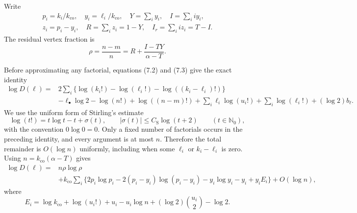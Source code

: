 

Write
\[\begin{gathered}
p_i=k_i/k_{\mathrm{co}},\quad y_i=\ell_i/k_{\mathrm{co}},\quad
 Y=\sum_i y_i,\quad I=\sum_i i y_i,\\
z_i=p_i-y_i,\quad R=\sum_i z_i=1-Y,\quad
 I_r=\sum_i i z_i=T-I.
\end{gathered}
\tag{7.12}\]
The residual vertex fraction is
\begin{equation*}
 \rho=\frac{n-m}{n}
 =R+\frac{I-TY}{\alpha-T}.
 \tag{7.13}
\end{equation*}

Before approximating any factorial, equations (7.2) and (7.3) give the exact
identity
\[
\begin{split}
\log D(\ell)={}&
2\sum_i\{\log(k_i!)-\log(\ell_i!)-\log((k_i-\ell_i)!)\}\\
&-\ell_\bullet\log 2-\log(n!)+\log((n-m)!)
 +\sum_i\ell_i\log(u_i!)+\sum_i\log(\ell_i!)
 +(\log 2)b_\ell.
\end{split}
\]
We use the uniform form of Stirling's estimate
\[
  \log(t!)=t\log t-t+\sigma(t),
  \qquad
  |\sigma(t)|\le C_{\mathrm S}\log(t+2)
  \qquad(t\in\mathbb N_0),
\]
with the convention $0\log0=0$. Only a fixed number of factorials occurs in
the preceding identity, and every argument is at most $n$. Therefore the total
remainder is $O(\!\log n)$ uniformly, including when some $\ell_i$ or
$k_i-\ell_i$ is zero. Using $n=k_{\mathrm{co}}(\alpha-T)$ gives
\begin{equation*}
\begin{split}
 \log D(\ell)={}&n\rho\log\rho\\
 &+k_{\mathrm{co}}\sum_i\{2p_i\log p_i
     -2(p_i-y_i)\log(p_i-y_i)
     -y_i\log y_i-y_i+y_iE_i\}
     +O(\!\log n),
\end{split}
 \tag{7.14}
\end{equation*}
where
\begin{equation*}
 E_i=\log k_{\mathrm{co}}+\log(u_i!)+u_i-u_i\log n
       +(\log 2)\binom{u_i}{2}-\log 2.
 \tag{7.15}
\end{equation*}

